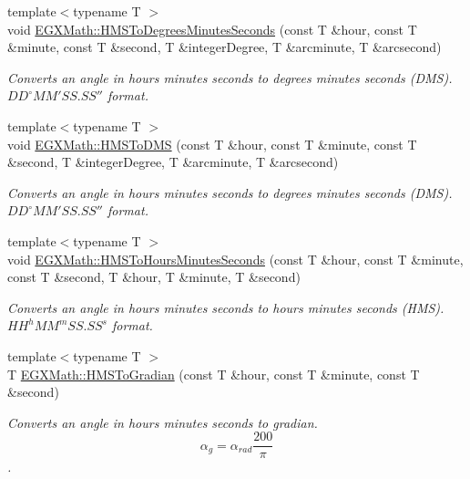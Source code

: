 \begin{DoxyCompactItemize}
{\footnotesize template$<$typename T $>$ }\\void \mbox{\hyperlink{group___e_g_x_math-_angle_conversions-_h_m_s_ga7f694aec9b3e7cc9d94d510e27e4403f}{E\+G\+X\+Math\+::\+H\+M\+S\+To\+Degrees\+Minutes\+Seconds}} (const T \&hour, const T \&minute, const T \&second, T \&integer\+Degree, T \&arcminute, T \&arcsecond)
\begin{DoxyCompactList}\small\item\em Converts an angle in hours minutes seconds to degrees minutes seconds (D\+MS). ${DD}^{\circ}{MM}'{SS.SS}''$ format. \end{DoxyCompactList}\item 
{\footnotesize template$<$typename T $>$ }\\void \mbox{\hyperlink{group___e_g_x_math-_angle_conversions-_h_m_s_ga7a875e85b32c4d7a8c6fa9a833f2bf7a}{E\+G\+X\+Math\+::\+H\+M\+S\+To\+D\+MS}} (const T \&hour, const T \&minute, const T \&second, T \&integer\+Degree, T \&arcminute, T \&arcsecond)
\begin{DoxyCompactList}\small\item\em Converts an angle in hours minutes seconds to degrees minutes seconds (D\+MS). ${DD}^{\circ}{MM}'{SS.SS}''$ format. \end{DoxyCompactList}\item 
{\footnotesize template$<$typename T $>$ }\\void \mbox{\hyperlink{group___e_g_x_math-_angle_conversions-_h_m_s_ga25573fcb58b30f77a8797515d8b04b66}{E\+G\+X\+Math\+::\+H\+M\+S\+To\+Hours\+Minutes\+Seconds}} (const T \&hour, const T \&minute, const T \&second, T \&hour, T \&minute, T \&second)
\begin{DoxyCompactList}\small\item\em Converts an angle in hours minutes seconds to hours minutes seconds (H\+MS). ${HH}^h{MM}^m{SS.SS}^s$ format. \end{DoxyCompactList}\item 
{\footnotesize template$<$typename T $>$ }\\T \mbox{\hyperlink{group___e_g_x_math-_angle_conversions-_h_m_s_ga89aaece52b0760559444d0303bee3bf1}{E\+G\+X\+Math\+::\+H\+M\+S\+To\+Gradian}} (const T \&hour, const T \&minute, const T \&second)
\begin{DoxyCompactList}\small\item\em Converts an angle in hours minutes seconds to gradian. \[\alpha_{g}=\alpha_{rad}\frac{200}{\pi}\]. \end{DoxyCompactList}\item 

\end{DoxyCompactItemize}
